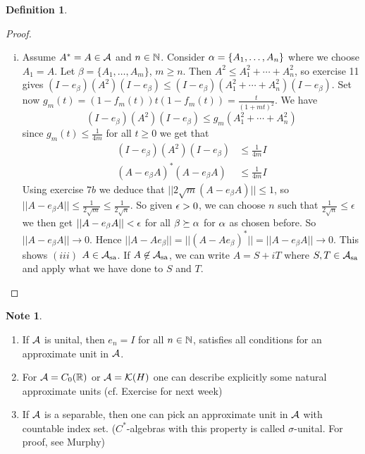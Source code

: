 \documentclass[10pt,english,a4paper]{article}
\theoremstyle{definition}
\newtheorem*{definition}{Definition}
\newtheorem*{note}{Note}
\def\Assa{\As_{\text{sa}}}
\begin{document}
\begin{definition}
\begin{proof}
\begin{enumerate}[(i)]
\item 
Assume $A^* = A \in \mathcal{A}$ and $n \in \mathbb{N}$.
Consider $\alpha = \{A_1, \ldots, A_n\}$ where we choose $A_1 = A$.
Let  $\beta = \{A_1, \ldots, A_m\}$, $m \geq n$. Then 
$A^2 \leq A_{1}^{2} + \cdots + A_{n}^{2}$, so 
exercise 11 gives 
$(I - e_{\beta} )(A^2) (I -e_{\beta})\leq (I -e_{\beta})(A_{1}^{2} + \cdots +
A_{n}^{2})(I -e_{\beta})$. Set now 
$g_m(t) = (1-f_m(t))t (1-f_m(t)) = \frac{t}{(1+mt)^2}$.
We have 
\[ (I - e_{\beta} )(A^2) (I -e_{\beta})\leq 
g_m(A_{1}^{2} + \cdots + A_{n}^{2})
\]
since $g_m(t) \leq \frac{1}{4m}$ for all $t \geq 0$ we get that
\begin{align*}
    (I - e_{\beta} )(A^2) (I -e_{\beta}) &\leq \frac{1}{4m} I \\
    (A-e_{\beta}A)^* (A - e_{\beta}A) &\leq \frac{1}{4m} I
\end{align*}
Using exercise $7b$ we deduce that 
$||2\sqrt{m} (A -e_{\beta}A)|| \leq 1$, so $||A-e_{\beta}A|| \leq
\frac{1}{2\sqrt{m}} \leq \frac{1}{2\sqrt{n}}$.
So given $\epsilon > 0$, we can choose $n$ such that $\tfrac{1}{2\sqrt{n}} \leq \epsilon$
we then get $||A-e_{\beta}A||< \epsilon$ for all $\beta \succeq \alpha$ for $\alpha$ as 
chosen before. So $||A-e_{\beta}A || \to 0$. Hence 
$||A-Ae_{\beta}|| = ||(A - Ae_{\beta})^*|| = ||A-e_{\beta}A|| \to 0$.
This shows $(iii)$ $A \in \Assa$. If $A \not\in \Assa$, we can write 
$A = S + iT$ where $S,T \in \Assa$ and apply what we have done to $S$ and $T$.

\end{enumerate}

\end{proof}


\begin{note}
\leavevmode
\begin{enumerate}[(1)]
    \item If $\mathcal{A}$ is unital, then $e_{n}  =I$ for all $n \in \mathbb{N}$, satisfies 
all conditions for an approximate unit in $\mathcal{A}$.

\item For $\mathcal{A} = C_{0}(\mathbb{R})$ or $\mathcal{A} = \mathcal{K}(H)$ one can describe 
explicitly some natural approximate units (cf. Exercise for next week)

\item If $\mathcal{A}$ is a separable, then one can pick an approximate unit in 
$\mathcal{A}$ with countable index set. 
($C^*$-algebras with this property is called $\sigma$-unital. For proof, see 
Murphy)

\end{enumerate}    

\end{note}

\end{definition}
\end{document}
